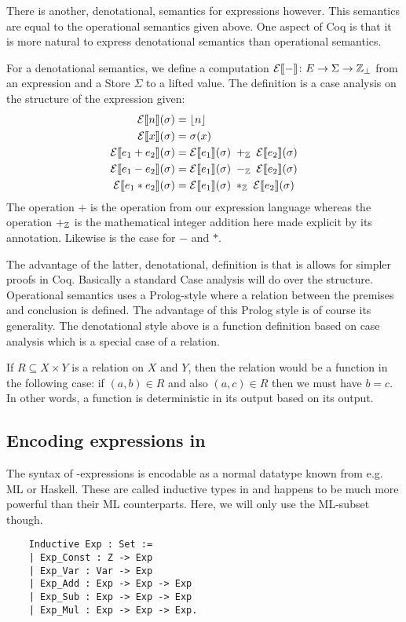 There is another, denotational, semantics for expressions
however. This semantics are equal to the operational semantics given
above. One aspect of Coq is that it is more natural to express
denotational semantics than operational semantics.

\label{exp:denot-semantics}
For a denotational semantics, we define a computation
$\mathcal{E}|[-|] \colon E \to \Sigma \to \mathbb{Z}_{\perp}$ from an
expression and a Store $\Sigma$ to a lifted value. The definition is a
case analysis on the structure of the expression given:
\begin{align*}
  \mathcal{E}|[n|](\sigma) & = \lfloor n \rfloor\\
  \mathcal{E}|[x|](\sigma) & = \sigma (x)\\
  \mathcal{E}|[e_1 + e_2|](\sigma) & = \mathcal{E}|[e_1|](\sigma) \;
  +_{\mathbb{Z}} \;
  \mathcal{E}|[e_2|](\sigma)\\
  \mathcal{E}|[e_1 - e_2|](\sigma) & = \mathcal{E}|[e_1|](\sigma) \;
  -_{\mathbb{Z}} \;
  \mathcal{E}|[e_2|](\sigma)\\
  \mathcal{E}|[e_1 * e_2|](\sigma) & = \mathcal{E}|[e_1|](\sigma) \;
  *_{\mathbb{Z}} \;
  \mathcal{E}|[e_2|](\sigma)
\end{align*}
The operation $+$ is the operation from our expression language
whereas the operation $+_{\mathbb{Z}}$ is the mathematical integer addition
here made explicit by its annotation. Likewise is the case for $-$ and
$*$.

The advantage of the latter, denotational, definition is that is
allows for simpler proofs in Coq. Basically a standard Case analysis
will do over the structure. Operational semantics uses a Prolog-style
where a relation between the premises and conclusion is defined. The
advantage of this Prolog style is of course its generality. The
denotational style above is a function definition based on case
analysis which is a special case of a relation.

If $R \subseteq X \times Y$ is a relation on $X$ and $Y$, then the
relation would be a function in the following case: if $(a, b) \in R$
and also $(a, c) \in R$ then we must have $b = c$. In other words, a
function is deterministic in its output based on its output.

\subsection{Encoding expressions in \coq{}}

The syntax of \janusz{}-expressions is encodable as a normal datatype
known from e.g. ML or Haskell. These are called inductive types in
\coq{} and happens to be much more powerful than their ML
counterparts. Here, we will only use the ML-subset though.
\begin{verbatim}
    Inductive Exp : Set :=
    | Exp_Const : Z -> Exp
    | Exp_Var : Var -> Exp
    | Exp_Add : Exp -> Exp -> Exp
    | Exp_Sub : Exp -> Exp -> Exp
    | Exp_Mul : Exp -> Exp -> Exp.
\end{verbatim}

